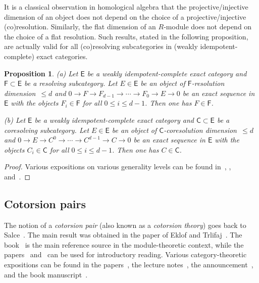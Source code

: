 \documentclass[12pt,a4paper]{amsart}
\newcommand{\+}{\nobreakdash-}
\renewcommand{\:}{\colon}
\newcommand{\rarrow}{\longrightarrow}
\newcommand{\sE}{\mathsf E}
\newcommand{\sF}{\mathsf F}
\newcommand{\sC}{\mathsf C}
\theoremstyle{plain}
\newtheorem{prop}[thm]{Proposition}
\theoremstyle{definition}
\begin{document}
 It is a classical observation in homological algebra that
the projective/injective dimension of an object does not depend on
the choice of a projective/injective (co)resolution.
 Similarly, the flat dimension of an $R$\+module does not depend on
the choice of a flat resolution.
 Such results, stated in the following proposition, are actually valid
for all (co)resolving subcategories in (weakly idempotent-complete)
exact categories.

\begin{prop} \label{co-resolution-dimension-prop}
\textup{(a)} Let\/ $\sE$ be a weakly idempotent-complete exact category
and\/ $\sF\subset\sE$ be a resolving subcategory.
 Let $E\in\sE$ be an object of\/ $\sF$\+resolution dimension\/~$\le d$
and\/ $0\rarrow F\rarrow F_{d-1}\rarrow\dotsb\rarrow F_0\rarrow E
\rarrow0$ be an exact sequence in\/ $\sE$ with the objects $F_i\in\sF$
for all\/ $0\le i\le d-1$.
 Then one has $F\in\sF$. \par
\textup{(b)} Let\/ $\sE$ be a weakly idempotent-complete exact category
and\/ $\sC\subset\sE$ be a coresolving subcategory.
 Let $E\in\sE$ be an object of\/ $\sC$\+coresolution dimension\/~$\le d$
and\/ $0\rarrow E\rarrow C^0\rarrow\dotsb\rarrow C^{d-1}\rarrow C
\rarrow0 $ be an exact sequence in\/ $\sE$ with the objects $C_i\in\sC$
for all\/ $0\le i\le d-1$.
 Then one has $C\in\sC$.
\end{prop}

\begin{proof}
 Various expositions on various generality levels can be found
in~\cite[Lemma~2.1]{Zhu}, \cite[Proposition~2.3(1)]{Sto},
and~\cite[Corollary~A.5.2]{Pcosh}.  
\end{proof}

\subsection{Cotorsion pairs}
 The notion of a \emph{cotorsion pair} (also known as a \emph{cotorsion
theory}) goes back to Salce~\cite{Sal}.
 The main result was obtained in the paper of Eklof and
Trlifaj~\cite{ET}.
 The book~\cite[Chapter~6]{GT} is the main reference source in
the module-theoretic context, while the papers~\cite[Sections~8
and~12]{Pcta} and~\cite[Introduction]{Pctrl} can be used for
introductory reading.
 Various category-theoretic expositions can be found in
the papers~\cite{SaoSt,Pal}, the lecture notes~\cite{Sto-ICRA},
the announcement~\cite{Pphil}, and the book
manuscript~\cite[Appendix~B]{Pcosh}.
\end{document}
